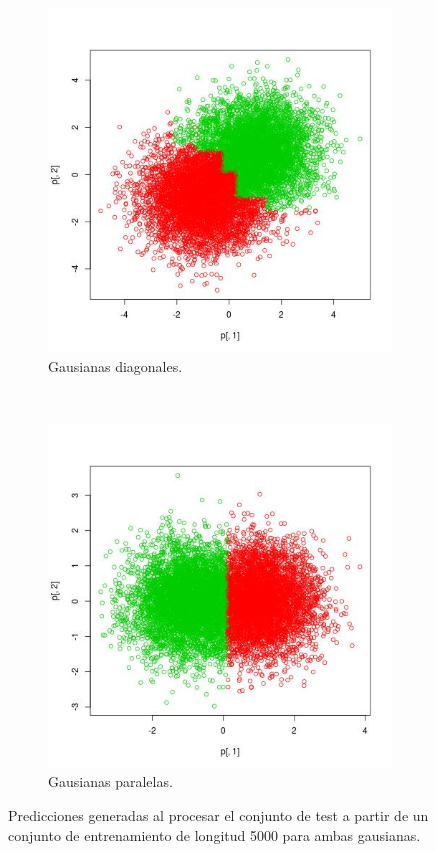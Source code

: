 \documentclass[12pt, a4paper]{article}
\begin{document}
\begin{figure}
    \begin{subfigure}[b]{0.45\textwidth}
        \includegraphics[width=\textwidth]{gausianasA}
        \caption{Gausianas diagonales.}
    \end{subfigure}
      ~ %
    \begin{subfigure}[b]{0.45\textwidth}
        \includegraphics[width=\textwidth]{gausianasB}
        \caption{Gausianas paralelas.}
    \end{subfigure}
    \caption{Predicciones generadas al procesar el conjunto de test a partir de un conjunto de entrenamiento de longitud 5000 para ambas gausianas.}
\end{figure}
\end{document}
